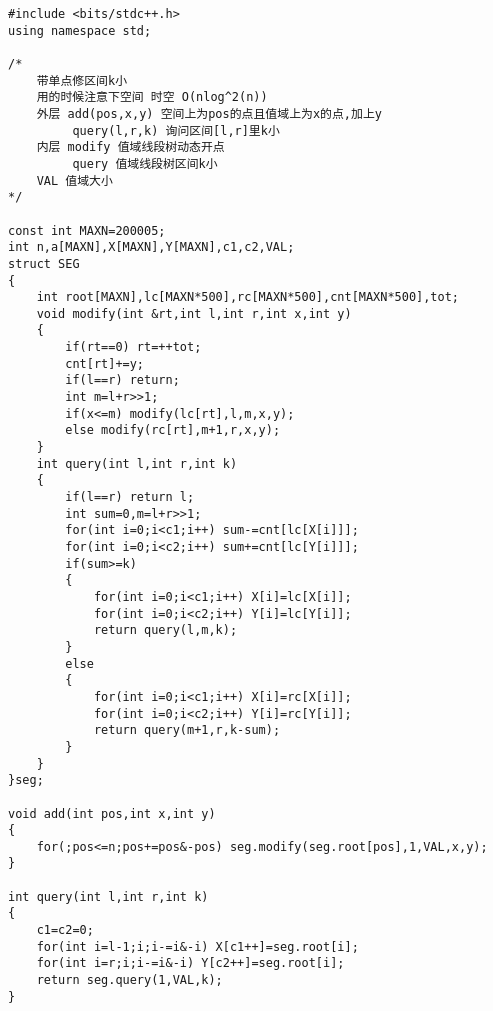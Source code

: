 \begin{lstlisting}
#include <bits/stdc++.h>
using namespace std;

/*
    带单点修区间k小
    用的时候注意下空间 时空 O(nlog^2(n))
    外层 add(pos,x,y) 空间上为pos的点且值域上为x的点,加上y
         query(l,r,k) 询问区间[l,r]里k小
    内层 modify 值域线段树动态开点
         query 值域线段树区间k小
    VAL 值域大小
*/

const int MAXN=200005;
int n,a[MAXN],X[MAXN],Y[MAXN],c1,c2,VAL;
struct SEG
{
    int root[MAXN],lc[MAXN*500],rc[MAXN*500],cnt[MAXN*500],tot;
    void modify(int &rt,int l,int r,int x,int y)
    {
        if(rt==0) rt=++tot;
        cnt[rt]+=y;
        if(l==r) return;
        int m=l+r>>1;
        if(x<=m) modify(lc[rt],l,m,x,y);
        else modify(rc[rt],m+1,r,x,y);
    }
    int query(int l,int r,int k)
    {
        if(l==r) return l;
        int sum=0,m=l+r>>1;
        for(int i=0;i<c1;i++) sum-=cnt[lc[X[i]]];
        for(int i=0;i<c2;i++) sum+=cnt[lc[Y[i]]];
        if(sum>=k)
        {
            for(int i=0;i<c1;i++) X[i]=lc[X[i]];
            for(int i=0;i<c2;i++) Y[i]=lc[Y[i]];
            return query(l,m,k);
        }
        else
        {
            for(int i=0;i<c1;i++) X[i]=rc[X[i]];
            for(int i=0;i<c2;i++) Y[i]=rc[Y[i]];
            return query(m+1,r,k-sum);
        }
    }
}seg;

void add(int pos,int x,int y)
{
    for(;pos<=n;pos+=pos&-pos) seg.modify(seg.root[pos],1,VAL,x,y);
}

int query(int l,int r,int k)
{
    c1=c2=0;
    for(int i=l-1;i;i-=i&-i) X[c1++]=seg.root[i];
    for(int i=r;i;i-=i&-i) Y[c2++]=seg.root[i];
    return seg.query(1,VAL,k);
}
\end{lstlisting}